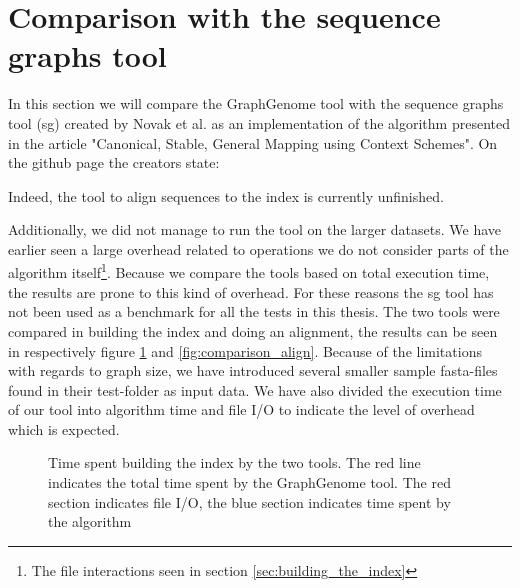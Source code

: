 \documentclass[thesis.tex]{subfiles}
\begin{document}
\section{Comparison with the sequence graphs tool}
In this section we will compare the GraphGenome tool with the sequence graphs tool (sg) created by Novak et al. as an implementation of the algorithm presented in the article "Canonical, Stable, General Mapping using Context Schemes". On the github page \cite{sg_git} the creators state:
\begin{displayquote}
Indeed, the tool to align sequences to the index is currently unfinished.
\end{displayquote}
Additionally, we did not manage to run the tool on the larger datasets. We have earlier seen a large overhead related to operations we do not consider parts of the algorithm itself\footnote{The file interactions seen in section \ref{sec:building_the_index}}. Because we compare the tools based on total execution time, the results are prone to this kind of overhead. For these reasons the sg tool has not been used as a benchmark for all the tests in this thesis. The two tools were compared in building the index and doing an alignment, the results can be seen in respectively figure \ref{fig:comparison_build} and \ref{fig:comparison_align}. Because of the limitations with regards to graph size, we have introduced several smaller sample fasta-files found in their test-folder as input data. We have also divided the execution time of our tool into algorithm time and file I/O to indicate the level of overhead which is expected.
\label{sec:comparison_tools}
\begin{figure}[!hb]
  \caption{Time spent building the index by the two tools. The red line indicates the total time spent by the GraphGenome tool. The red section indicates file I/O, the blue section indicates time spent by the algorithm}
  \label{fig:comparison_build}
\end{figure}
\end{document}
